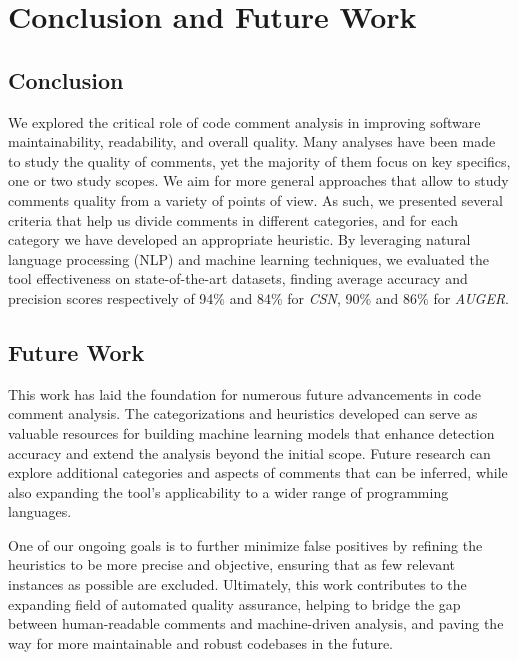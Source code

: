 
\chapter{Conclusion and Future Work} %

\label{Chapter5}


\section{Conclusion}
We explored the critical role of code comment analysis in improving software maintainability, readability, and overall quality. Many analyses have been made to study the quality of comments, yet the majority of them focus on key specifics, one or two study scopes. We aim for more general approaches that allow to study comments quality from a variety of points of view. As such, we presented several criteria that help us divide comments in different categories, and for each category we have developed an appropriate heuristic. By leveraging natural language processing (NLP) and machine learning techniques, we evaluated the tool effectiveness on state-of-the-art datasets, finding average accuracy and precision scores respectively of 94\% and 84\% for \textit{CSN}, 90\% and 86\% for \textit{AUGER}.

\section{Future Work}
This work has laid the foundation for numerous future advancements in code comment analysis. The categorizations and heuristics developed can serve as valuable resources for building machine learning models that enhance detection accuracy and extend the analysis beyond the initial scope. Future research can explore additional categories and aspects of comments that can be inferred, while also expanding the tool's applicability to a wider range of programming languages.

\noindent One of our ongoing goals is to further minimize false positives by refining the heuristics to be more precise and objective, ensuring that as few relevant instances as possible are excluded. Ultimately, this work contributes to the expanding field of automated quality assurance, helping to bridge the gap between human-readable comments and machine-driven analysis, and paving the way for more maintainable and robust codebases in the future.